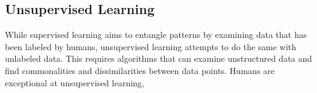 \subsection{Unsupervised Learning}
While supervised learning aims to entangle patterns by examining data that has been labeled by humans, unsupervised learning attempts to do the same with unlabeled data. This requires algorithms that can examine unstructured data and find commonalities and dissimilarities between data points. Humans are exceptional at unsupervised learning, 